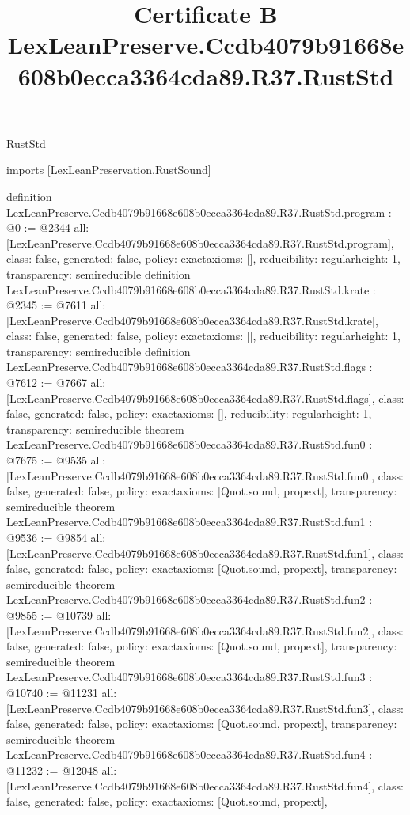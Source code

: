 \begin{lexlean}{RustStd}
\title{Certificate B LexLeanPreserve.Ccdb4079b91668e608b0ecca3364cda89.R37.RustStd}
\begin{coremodule}
imports [LexLeanPreservation.RustSound]

definition LexLeanPreserve.Ccdb4079b91668e608b0ecca3364cda89.R37.RustStd.program : @0 := @2344 {
  all: [LexLeanPreserve.Ccdb4079b91668e608b0ecca3364cda89.R37.RustStd.program],
  class: false,
  generated: false,
  policy: exact{axioms: []},
  reducibility: regular{height: 1},
  transparency: semireducible
}
definition LexLeanPreserve.Ccdb4079b91668e608b0ecca3364cda89.R37.RustStd.krate : @2345 := @7611 {
  all: [LexLeanPreserve.Ccdb4079b91668e608b0ecca3364cda89.R37.RustStd.krate],
  class: false,
  generated: false,
  policy: exact{axioms: []},
  reducibility: regular{height: 1},
  transparency: semireducible
}
definition LexLeanPreserve.Ccdb4079b91668e608b0ecca3364cda89.R37.RustStd.flags : @7612 := @7667 {
  all: [LexLeanPreserve.Ccdb4079b91668e608b0ecca3364cda89.R37.RustStd.flags],
  class: false,
  generated: false,
  policy: exact{axioms: []},
  reducibility: regular{height: 1},
  transparency: semireducible
}
theorem LexLeanPreserve.Ccdb4079b91668e608b0ecca3364cda89.R37.RustStd.fun0 : @7675 := @9535 {
  all: [LexLeanPreserve.Ccdb4079b91668e608b0ecca3364cda89.R37.RustStd.fun0],
  class: false,
  generated: false,
  policy: exact{axioms: [Quot.sound, propext]},
  transparency: semireducible
}
theorem LexLeanPreserve.Ccdb4079b91668e608b0ecca3364cda89.R37.RustStd.fun1 : @9536 := @9854 {
  all: [LexLeanPreserve.Ccdb4079b91668e608b0ecca3364cda89.R37.RustStd.fun1],
  class: false,
  generated: false,
  policy: exact{axioms: [Quot.sound, propext]},
  transparency: semireducible
}
theorem LexLeanPreserve.Ccdb4079b91668e608b0ecca3364cda89.R37.RustStd.fun2 : @9855 := @10739 {
  all: [LexLeanPreserve.Ccdb4079b91668e608b0ecca3364cda89.R37.RustStd.fun2],
  class: false,
  generated: false,
  policy: exact{axioms: [Quot.sound, propext]},
  transparency: semireducible
}
theorem LexLeanPreserve.Ccdb4079b91668e608b0ecca3364cda89.R37.RustStd.fun3 : @10740 := @11231 {
  all: [LexLeanPreserve.Ccdb4079b91668e608b0ecca3364cda89.R37.RustStd.fun3],
  class: false,
  generated: false,
  policy: exact{axioms: [Quot.sound, propext]},
  transparency: semireducible
}
theorem LexLeanPreserve.Ccdb4079b91668e608b0ecca3364cda89.R37.RustStd.fun4 : @11232 := @12048 {
  all: [LexLeanPreserve.Ccdb4079b91668e608b0ecca3364cda89.R37.RustStd.fun4],
  class: false,
  generated: false,
  policy: exact{axioms: [Quot.sound, propext]},
}
\end{coremodule}
\end{lexlean}
